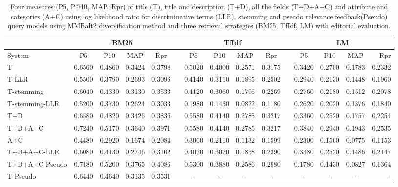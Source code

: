 \begin{table}[H]
\begin{center}
\scriptsize
\caption{
Four measures (P\@5, P@10, MAP, Rpr) of title (T), title and description (T+D), all the fields (T+D+A+C) and attribute and categories (A+C) using log likelihood ratio for discriminative terms (LLR), stemming and pseudo relevance feedback(Pseudo) query models using MMRalt2 diversification method and three retrieval strategies (BM25, TfIdf, LM) with editorial evaluation.}
\label{table:mmrAlt2Ed}

\begin{tabular}{lcccccccccccccr}
\toprule
 & \multicolumn{4}{c}{BM25} &    & \multicolumn{4}{c}{TfIdf} &    & \multicolumn{4}{c}{LM} \\
\midrule
System & P\@5 & P\@10 & MAP & Rpr &   & P\@5 & P\@10 & MAP & Rpr &   & P\@5 & P\@10 & MAP & Rpr \\
\midrule
T & 0.6560 & 0.4860 & 0.3424 & 0.3798 &   & 0.5020 & 0.4000 & 0.2571 & 0.3175 &   & 0.3420 & 0.2700 & 0.1783 & 0.2332 \\
T-LLR & 0.5500 & 0.3790 & 0.2693 & 0.3096 &   & 0.4140 & 0.3110 & 0.1895 & 0.2502 &   & 0.2940 & 0.2130 & 0.1448 & 0.1960 \\
T-stemming & 0.6040 & 0.4330 & 0.3130 & 0.3533 &   & 0.4120 & 0.3060 & 0.1796 & 0.2269 &   & 0.2760 & 0.2180 & 0.1512 & 0.2078 \\
T-stemming-LLR & 0.5200 & 0.3730 & 0.2624 & 0.3033 &   & 0.1980 & 0.1430 & 0.0822 & 0.1180 &   & 0.2620 & 0.2020 & 0.1376 & 0.1840 \\
T+D & 0.6580 & 0.4820 & 0.3426 & 0.3836 &   & 0.5580 & 0.4140 & 0.2785 & 0.3217 &   & 0.3360 & 0.2520 & 0.1757 & 0.2254 \\
T+D+A+C & 0.7240 & 0.5170 & 0.3640 & 0.3971 &   & 0.5580 & 0.4140 & 0.2785 & 0.3217 &   & 0.3840 & 0.2940 & 0.1943 & 0.2535 \\
A+C & 0.4480 & 0.2920 & 0.1674 & 0.2084 &   & 0.3060 & 0.2110 & 0.1132 & 0.1599 &   & 0.2300 & 0.1560 & 0.0775 & 0.1153 \\
T+D+A+C-LLR & 0.6080 & 0.4130 & 0.2746 & 0.3102 &   & 0.4020 & 0.3020 & 0.1858 & 0.2390 &   & 0.3380 & 0.2520 & 0.1486 & 0.2147 \\
T+D+A+C-Pseudo & 0.7180 & 0.5200 & 0.3765 & 0.4086 &   & 0.5300 & 0.3880 & 0.2586 & 0.2980 &   & 0.1780 & 0.1430 & 0.0827 & 0.1364 \\
T-Pseudo & 0.6440 & 0.4640 & 0.3135 & 0.3531 &   & - & - & - & - &   & - & - & - & -  \\
\bottomrule
\end{tabular}
\end{center}
\end{table}


